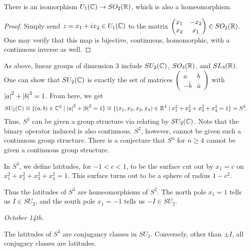 \begin{proposition}
    There is an isomorphism $U_{1}(\mathbb{C}) \to SO_{2}(\mathbb{R})$, which is also a homeomorphism.
\end{proposition}
\begin{proof}
    Simply send $z = x_{1}+ix_{2} \in U_{1}(\mathbb{C})$ to the matrix $\begin{pmatrix}
        x_{1} & -x_{2} \\ x_{2} & x_{1}
    \end{pmatrix} \in SO_{2}(\mathbb{R})$. One may verify that this map is bijective, continuous, homomorphic, with a continuous inverse as well.
\end{proof}

As above, linear groups of dimension $3$ include $SU_{2}(\mathbb{C})$, $SO_{3}(\mathbb{R})$, and $SL_{3}(\mathbb{R})$. One can show that $SU_{2}(\mathbb{C})$ is exactly the set of matrices $\begin{pmatrix}
    a & b \\ -\bar{b} & \bar{a}
\end{pmatrix}$ with $\left| a \right|^{2} + \left| b \right|^{2} = 1$. From here, we get
\begin{align}
    SU_{2}(\mathbb{C}) \cong \{(a,b) \in \mathbb{C}^{2} \mid \left| a \right|^{2} + \left| b \right|^{2} = 1\} \cong \{(x_{1},x_{2},x_{3},x_{4}) \in \mathbb{R}^{4} \mid x_{1}^{2} + x_{2}^{2} + x_{3}^{2} + x_{4}^{2} = 1\} = S^{3}.
\end{align}
Thus, $S^{3}$ can be given a group structure via relating by $SU_{2}(\mathbb{C})$. Note that the binary operator induced is also continuous. $S^{2}$, however, cannot be given such a continuous group structure. There is a conjecture that $S^{n}$ for $n \geq 4$ cannot be given a continuous group structure.

\begin{definition}
    In $S^{3}$, we define latitudes, for $-1 < c < 1$, to be the surface cut out by $x_{1} = c$ on $x_{1}^{2} + x_{2}^{2} + x_{3}^{2} + x_{4}^{2} = 1$. This surface turns out to be a sphere of radius $1-c^{2}$.
\end{definition}
Thus the latitudes of $S^{3}$ are homeomorphisms of $S^{2}$. The north pole $x_{1} = 1$ tells us $I \in SU_{2}$, and the south pole $x_{1} = -1$ tells us $-I \in SU_{2}$.

\textit{October 14th.}

\begin{proposition}
    The latitudes of $S^{3}$ are conjugancy classes in $SU_{2}$. Conversely, other than $\pm I$, all conjugacy classes are latitudes.
\end{proposition}


